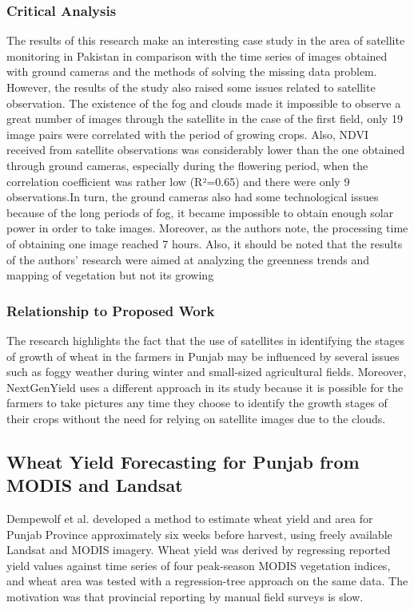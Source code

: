 \documentclass{FastFyp}
\begin{document}
\subsubsection{Critical Analysis}
The results of this research make an interesting case study in the area of satellite monitoring in Pakistan in comparison with the time series of images obtained with ground cameras and the methods of solving the missing data problem. However, the results of the study also raised some issues related to satellite observation. The existence of the fog and clouds made it impossible to observe a great number of images through the satellite in the case of the first field, only 19 image pairs were correlated with the period of growing crops. Also, NDVI received from satellite observations was considerably lower than the one obtained through ground cameras, especially during the flowering period, when the correlation coefficient was rather low (R²=0.65) and there were only 9 observations.In turn, the ground cameras also had some technological issues because of the long periods of fog, it became impossible to obtain enough solar power in order to take images. Moreover, as the authors note, the processing time of obtaining one image reached 7 hours. Also, it should be noted that the results of the authors' research were aimed at analyzing the greenness trends and mapping of vegetation but not its growing 

\subsubsection{Relationship to Proposed Work}
The research highlights the fact that the use of satellites in identifying the stages of growth of wheat in the farmers in Punjab may be influenced by several issues such as foggy weather during winter and small-sized agricultural fields. Moreover, NextGenYield uses a different approach in its study because it is possible for the farmers to take pictures any time they choose to identify the growth stages of their crops without the need for relying on satellite images due to the clouds. 


\subsection{Wheat Yield Forecasting for Punjab from MODIS and Landsat}

Dempewolf et al. \cite{ref:Dempewolf:2014} developed a method to estimate wheat yield and area for Punjab Province approximately six weeks before harvest, using freely available Landsat and MODIS imagery. Wheat yield was derived by regressing reported yield values against time series of four peak-season MODIS vegetation indices, and wheat area was tested with a regression-tree approach on the same data. The motivation was that provincial reporting by manual field surveys is slow.
\end{document}

